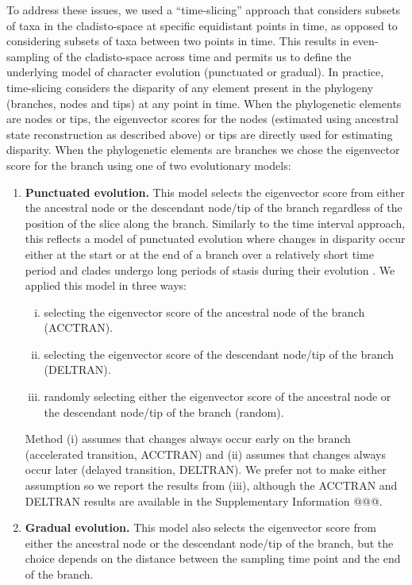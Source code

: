 \documentclass[12pt,letterpaper]{article}
\begin{document}
To address these issues, we used a ``time-slicing'' approach that considers subsets of taxa in the cladisto-space at specific equidistant points in time, as opposed to considering subsets of taxa between two points in time.
This results in even-sampling of the cladisto-space across time and permits us to define the underlying model of character evolution (punctuated or gradual).  
In practice, time-slicing considers the disparity of any element present in the phylogeny (branches, nodes and tips) at any point in time.
When the phylogenetic elements are nodes or tips, the eigenvector scores for the nodes (estimated using ancestral state reconstruction as described above) or tips are directly used for estimating disparity.
When the phylogenetic elements are branches we chose the eigenvector score for the branch using one of two evolutionary models:
\begin{enumerate}
    \item{\textbf{Punctuated evolution.}} 
    This model selects the eigenvector score from either the ancestral node or the descendant node/tip of the branch regardless of the position of the slice along the branch. 
    Similarly to the time interval approach, this reflects a model of punctuated evolution where changes in disparity occur either at the start or at the end of a branch over a relatively short time period and clades undergo long periods of stasis during their evolution \citep{Gould1977,Hunt20112007}.
    We applied this model in three ways: 
    \begin{enumerate}[(i)]
      \item selecting the eigenvector score of the ancestral node of the branch (ACCTRAN).
      \item selecting the eigenvector score of the descendant node/tip of the branch (DELTRAN).
      \item randomly selecting either the eigenvector score of the ancestral node or the descendant node/tip of the branch (random).
    \end{enumerate}
    Method (i) assumes that changes always occur early on the branch (accelerated transition, ACCTRAN) and (ii) assumes that changes always occur later (delayed transition, DELTRAN).
    We prefer not to make either assumption so we report the results from (iii), although the ACCTRAN and DELTRAN results are available in the Supplementary Information @@@. %
    \item{\textbf{Gradual evolution.}}
    This model also selects the eigenvector score from either the ancestral node or the descendant node/tip of the branch, but the choice depends on the distance between the sampling time point and the end of the branch.

\end{enumerate}
\end{document}
